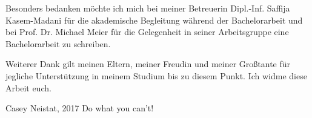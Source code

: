 Besonders bedanken möchte ich mich bei meiner Betreuerin Dipl.-Inf. Saffija Kasem-Madani für die akademische Begleitung während der Bachelorarbeit und bei Prof. Dr. Michael Meier für die Gelegenheit in seiner Arbeitsgruppe eine Bachelorarbeit zu schreiben.

Weiterer Dank gilt meinen Eltern, meiner Freudin und meiner Großtante für jegliche Unterstützung in meinem Studium bis zu diesem Punkt. Ich widme diese Arbeit euch.


\begin{bigquote}{Casey Neistat, 2017}
Do what you can't!
\end{bigquote}
